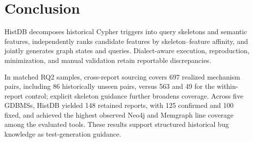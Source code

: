 \documentclass[acmsmall,screen,anonymous]{acmart}
\begin{document}
\section{Conclusion}

HistDB decomposes historical Cypher triggers into query skeletons and semantic features, independently ranks candidate features by skeleton--feature affinity, and jointly generates graph states and queries. Dialect-aware execution, reproduction, minimization, and manual validation retain reportable discrepancies.

In matched RQ2 samples, cross-report sourcing covers 697 realized mechanism pairs, including 86 historically unseen pairs, versus 563 and 49 for the within-report control; explicit skeleton guidance further broadens coverage. Across five GDBMSs, HistDB yielded 148 retained reports, with 125 confirmed and 100 fixed, and achieved the highest observed Neo4j and Memgraph line coverage among the evaluated tools. These results support structured historical bug knowledge as test-generation guidance.

\end{document}
